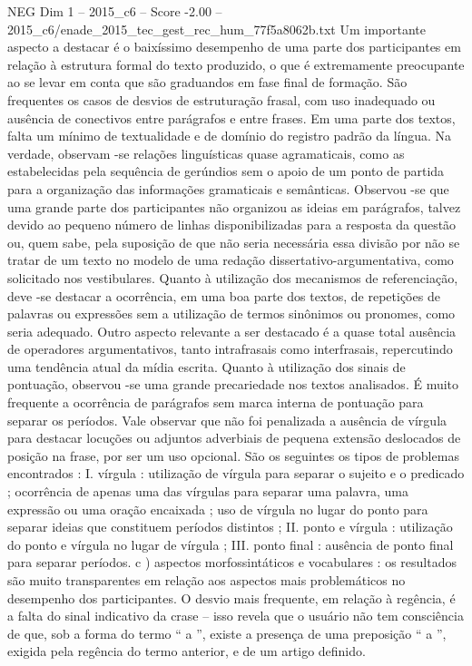 \begin{textsample}{NEG Dim 1 – 2015\_c6 – Score -2.00 – 2015\_c6/enade\_2015\_tec\_gest\_rec\_hum\_77f5a8062b.txt}
Um importante aspecto a destacar é o baixíssimo desempenho de uma parte dos participantes em relação à estrutura formal do texto produzido, o que é extremamente preocupante ao se levar em conta que são graduandos em fase final de formação.
São frequentes os casos de desvios de estruturação frasal, com uso inadequado ou ausência de conectivos entre parágrafos e entre frases.
Em uma parte dos textos, falta um mínimo de textualidade e de domínio do registro padrão da língua.
Na verdade, observam -se relações linguísticas quase agramaticais, como as estabelecidas pela sequência de gerúndios sem o apoio de um ponto de partida para a organização das informações gramaticais e semânticas.
Observou -se que uma grande parte dos participantes não organizou as ideias em parágrafos, talvez devido ao pequeno número de linhas disponibilizadas para a resposta da questão ou, quem sabe, pela suposição de que não seria necessária essa divisão por não se tratar de um texto no modelo de uma redação dissertativo-argumentativa, como solicitado nos vestibulares.
Quanto à utilização dos mecanismos de referenciação, deve -se destacar a ocorrência, em uma boa parte dos textos, de repetições de palavras ou expressões sem a utilização de termos sinônimos ou pronomes, como seria adequado.
Outro aspecto relevante a ser destacado é a quase total ausência de operadores argumentativos, tanto intrafrasais como interfrasais, repercutindo uma tendência atual da mídia escrita.
Quanto à utilização dos sinais de pontuação, observou -se uma grande precariedade nos textos analisados.
É muito frequente a ocorrência de parágrafos sem marca interna de pontuação para separar os períodos.
Vale observar que não foi penalizada a ausência de vírgula para destacar locuções ou adjuntos adverbiais de pequena extensão deslocados de posição na frase, por ser um uso opcional.
São os seguintes os tipos de problemas encontrados : I. vírgula : utilização de vírgula para separar o sujeito e o predicado ; ocorrência de apenas uma das vírgulas para separar uma palavra, uma expressão ou uma oração encaixada ; uso de vírgula no lugar do ponto para separar ideias que constituem períodos distintos ; II. ponto e vírgula : utilização do ponto e vírgula no lugar de vírgula ; III. ponto final : ausência de ponto final para separar períodos. c ) aspectos morfossintáticos e vocabulares : os resultados são muito transparentes em relação aos aspectos mais problemáticos no desempenho dos participantes.
O desvio mais frequente, em relação à regência, é a falta do sinal indicativo da crase – isso revela que o usuário não tem consciência de que, sob a forma do termo “ a ”, existe a presença de uma preposição “ a ”, exigida pela regência do termo anterior, e de um artigo definido.

\end{textsample}

